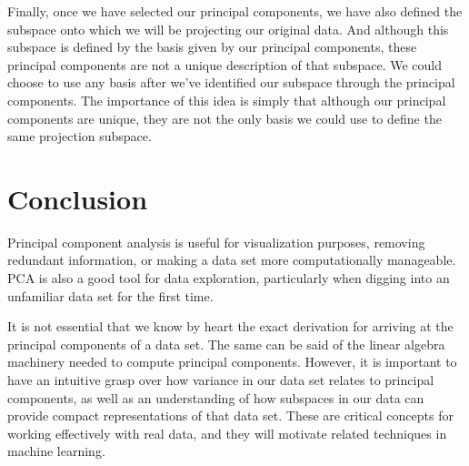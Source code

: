 Finally, once we have selected our principal components, we have also defined the subspace onto which we will be projecting our original data. And although this subspace is defined by the basis given by our principal components, these principal components are not a unique description of that subspace. We could choose to use any basis after we've identified our subspace through the principal components. The importance of this idea is simply that although our principal components are unique, they are not the only basis we could use to define the same projection subspace.

\section{Conclusion}
Principal component analysis is useful for visualization purposes, removing redundant information, or making a data set more computationally manageable. PCA is also a good tool for data exploration, particularly when digging into an unfamiliar data set for the first time.

It is not essential that we know by heart the exact derivation for arriving at the principal components of a data set. The same can be said of the linear algebra machinery needed to compute principal components. However, it is important to have an intuitive grasp over how variance in our data set relates to principal components, as well as an understanding of how subspaces in our data can provide compact representations of that data set. These are critical concepts for working effectively with real data, and they will motivate related techniques in machine learning.
